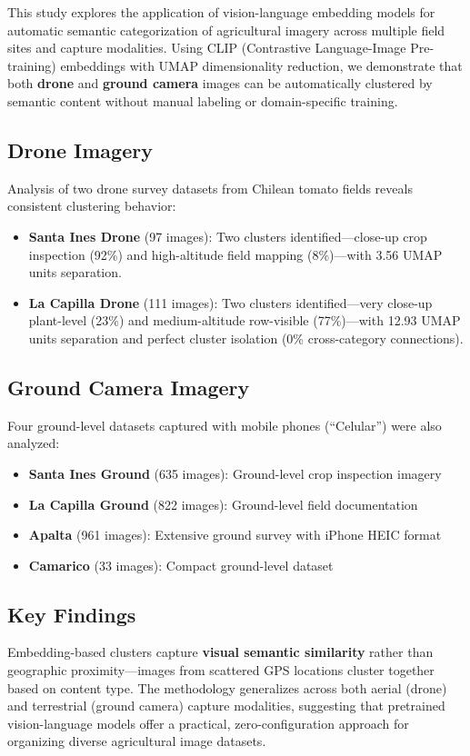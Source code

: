 
This study explores the application of vision-language embedding models for automatic semantic categorization of agricultural imagery across multiple field sites and capture modalities. Using CLIP (Contrastive Language-Image Pre-training) embeddings with UMAP dimensionality reduction, we demonstrate that both \textbf{drone} and \textbf{ground camera} images can be automatically clustered by semantic content without manual labeling or domain-specific training.

\subsection*{Drone Imagery}
Analysis of two drone survey datasets from Chilean tomato fields reveals consistent clustering behavior:

\begin{itemize}
    \item \textbf{Santa Ines Drone} (97 images): Two clusters identified---close-up crop inspection (92\%) and high-altitude field mapping (8\%)---with 3.56 UMAP units separation.
    \item \textbf{La Capilla Drone} (111 images): Two clusters identified---very close-up plant-level (23\%) and medium-altitude row-visible (77\%)---with 12.93 UMAP units separation and perfect cluster isolation (0\% cross-category connections).
\end{itemize}

\subsection*{Ground Camera Imagery}
Four ground-level datasets captured with mobile phones (``Celular'') were also analyzed:

\begin{itemize}
    \item \textbf{Santa Ines Ground} (635 images): Ground-level crop inspection imagery
    \item \textbf{La Capilla Ground} (822 images): Ground-level field documentation
    \item \textbf{Apalta} (961 images): Extensive ground survey with iPhone HEIC format
    \item \textbf{Camarico} (33 images): Compact ground-level dataset
\end{itemize}

\subsection*{Key Findings}
Embedding-based clusters capture \textbf{visual semantic similarity} rather than geographic proximity---images from scattered GPS locations cluster together based on content type. The methodology generalizes across both aerial (drone) and terrestrial (ground camera) capture modalities, suggesting that pretrained vision-language models offer a practical, zero-configuration approach for organizing diverse agricultural image datasets.
